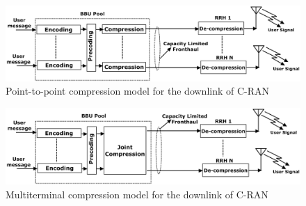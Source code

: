 \begin{multicols}{2}
\begin{itemize}
\end{itemize}
\end{multicols}



\begin{figure}[H]
\centering
\includegraphics[scale=.49]{src/Figures/chap3/fig06.jpg}
\caption{Point-to-point compression model for the downlink of C-RAN}\label{fig06}
\vspace{2cm}
\end{figure}


\begin{figure}[H]
\vspace{-.6cm}
\centering
\includegraphics[scale=.5]{src/Figures/chap3/fig07.jpg}
\caption{Multiterminal compression model for the downlink of C-RAN}\label{fig07}
\vspace {.3cm}
\end{figure}



